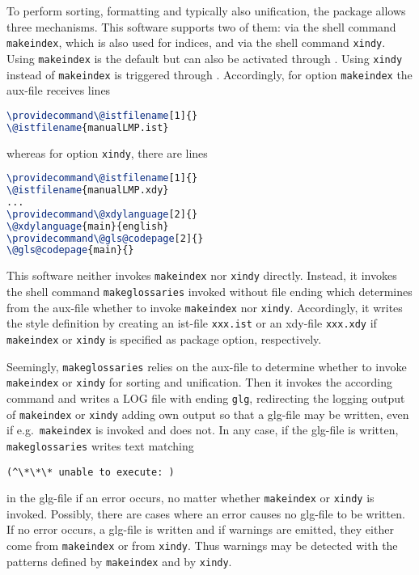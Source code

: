 To perform sorting, formatting and typically also unification, 
the package  allows three mechanisms. 
This software supports two of them: 
via the shell command \texttt{makeindex}, which is also used for indices, 
and via the shell command \texttt{xindy}. 
Using \texttt{makeindex} is the default but can also be activated through 
. 
Using \texttt{xindy} instead of \texttt{makeindex} is triggered through 
. 
Accordingly, for option \texttt{makeindex} the aux-file receives lines 
%
\begin{lstlisting}[language=TeX]
\providecommand\@istfilename[1]{}
\@istfilename{manualLMP.ist}
\end{lstlisting}
%
whereas for option \texttt{xindy}, there are lines 
%
\begin{lstlisting}[language=TeX]
\providecommand\@istfilename[1]{}
\@istfilename{manualLMP.xdy}
...
\providecommand\@xdylanguage[2]{}
\@xdylanguage{main}{english}
\providecommand\@gls@codepage[2]{}
\@gls@codepage{main}{}
\end{lstlisting}



This software neither invokes \texttt{makeindex} nor \texttt{xindy} directly. 
Instead, it invokes the shell command \texttt{makeglossaries}
invoked without file ending  
which determines from the aux-file 
whether to invoke \texttt{makeindex} nor \texttt{xindy}. 
Accordingly, it writes the style definition 
by creating an ist-file \texttt{xxx.ist} or an xdy-file \texttt{xxx.xdy} 
if \texttt{makeindex} or \texttt{xindy} is specified as package option, 
respectively. 

Seemingly, \texttt{makeglossaries} relies on the aux-file 
to determine whether to invoke \texttt{makeindex} or \texttt{xindy} 
for sorting and unification. 
Then it invokes the according command and writes a LOG file 
with ending \texttt{glg}, 
redirecting the logging output of \texttt{makeindex} or \texttt{xindy} 
adding own output so that a glg-file may be written, 
even if e.g.~\texttt{makeindex} is invoked and does not. 
In any case, if the glg-file is written, 
\texttt{makeglossaries} writes text matching 
%
\begin{verbatim}
(^\*\*\* unable to execute: )
\end{verbatim}
%
in the glg-file if an error occurs, 
no matter whether \texttt{makeindex} or \texttt{xindy} is invoked. 
Possibly, there are cases where an error causes no glg-file to be written. 
If no error occurs, a glg-file is written 
and if warnings are emitted, 
they either come from \texttt{makeindex} or from \texttt{xindy}. 
Thus warnings may be detected with the patterns 
defined by \texttt{makeindex} and by \texttt{xindy}. 

